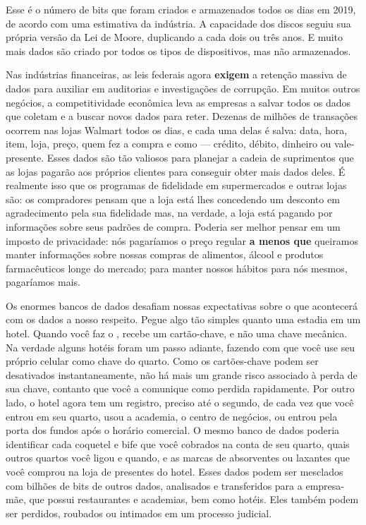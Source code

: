 Esse é o número de bits que foram criados e armazenados todos os dias em 2019,
de acordo com uma estimativa da indústria. A capacidade dos discos seguiu sua
própria versão da Lei de Moore, duplicando a cada dois ou três anos. E muito
mais dados são criado por todos os tipos de dispositivos, mas não armazenados.

Nas indústrias financeiras, as leis federais agora \textbf{exigem} a retenção
massiva de dados para auxiliar em auditorias e investigações de corrupção. Em
muitos outros negócios, a competitividade econômica leva as empresas a salvar
todos os dados que coletam e a buscar novos dados para reter. Dezenas de milhões
de transações ocorrem nas lojas Walmart todos os dias, e cada uma delas é salva:
data, hora, item, loja, preço, quem fez a compra e como --- crédito, débito,
dinheiro ou vale-presente. Esses dados são tão valiosos para planejar a cadeia
de suprimentos que as lojas pagarão aos próprios clientes para conseguir obter
mais dados deles. É realmente isso que os programas de fidelidade em
supermercados e outras lojas são: os compradores pensam que a loja está lhes
concedendo um desconto em agradecimento pela sua fidelidade mas, na verdade, a
loja está pagando por informações sobre seus padrões de compra. Poderia ser
melhor pensar em um imposto de privacidade: nós pagaríamos o preço regular
\textbf{a menos que} queiramos manter informações sobre nossas compras de
alimentos, álcool e produtos farmacêuticos longe do mercado; para manter nossos
hábitos para nós mesmos, pagaríamos mais.

Os enormes bancos de dados desafiam nossas expectativas sobre o que acontecerá
com os dados a nosso respeito. Pegue algo tão simples quanto uma estadia em um
hotel. Quando você faz o , recebe um cartão-chave, e não uma
chave mecânica. Na verdade alguns hotéis foram um passo adiante, fazendo com que
você use seu próprio celular como chave do quarto. Como os cartões-chave podem
ser desativados instantaneamente, não há mais um grande risco associado à perda
de sua chave, contanto que você a comunique como perdida rapidamente. Por outro
lado, o hotel agora tem um registro, preciso até o segundo, de cada vez que você
entrou em seu quarto, usou a academia, o centro de negócios, ou entrou pela
porta dos fundos após o horário comercial. O mesmo banco de dados poderia
identificar cada coquetel e bife que você cobrados na conta de seu quarto, quais
outros quartos você ligou e quando, e as marcas de absorventes ou laxantes que
você comprou na loja de presentes do hotel. Esses dados podem ser mesclados com
bilhões de bits de outros dados, analisados e transferidos para a empresa-mãe,
que possui restaurantes e academias, bem como hotéis. Eles também podem ser
perdidos, roubados ou intimados em um processo judicial.

